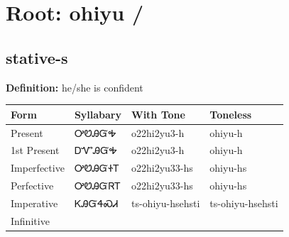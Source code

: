 \documentclass{article}%
\begin{document}
%
\normalsize%
\section*{Root: ohiyu / }%
\subsection*{stative-s}%
\textbf{Definition: }%
he/she is confident%
\\[0.5em]%
\begin{tabular}{|l|l|l|l|}%
\hline%
\textbf{Form}&\textbf{Syllabary}&\textbf{With Tone}&\textbf{Toneless}\\%
\hline%
Present&ᎤᏬᎯᏳᎭ&o22hi2yu3{-}h&ohiyu{-}h\\%
1st Present&ᎠᏉᎯᏳᎭ&o22hi2yu3{-}h&ohiyu{-}h\\%
Imperfective&ᎤᏬᎯᏳᏐᎢ&o22hi2yu33{-}hs&ohiyu{-}hs\\%
Perfective&ᎤᏬᎯᏳᏒᎢ&o22hi2yu33{-}hs&ohiyu{-}hs\\%
Imperative&ᏦᎯᏳᏎᏍᏗ&ts{-}ohiyu{-}hsehsti&ts{-}ohiyu{-}hsehsti\\%
Infinitive&&&\\%
\hline%
\end{tabular}%
\\[1em]%
\end{document}
